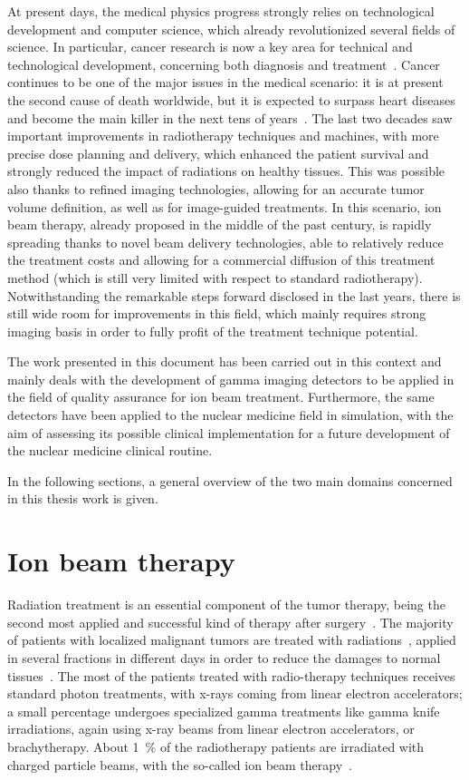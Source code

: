 At present days, the medical physics progress strongly relies on technological development and computer science, which already revolutionized several fields of science. In particular, cancer research is now a key area for technical and technological development, concerning both diagnosis and treatment~\parencite{Webb2009}. Cancer continues to be one of the major issues in the medical scenario: it is at present the second cause of death worldwide, but it is expected to surpass heart diseases and become the main killer in the next tens of years~\parencite{Jemal2010, Thun2010}. The last two decades saw important improvements in radiotherapy techniques and machines, with more precise dose planning and delivery, which enhanced the patient survival and strongly reduced the impact of radiations on healthy tissues. This was possible also thanks to refined imaging technologies, allowing for an accurate tumor volume definition, as well as for image-guided treatments. In this scenario, ion beam therapy, already proposed in the middle of the past century, is rapidly spreading thanks to novel beam delivery technologies, able to relatively reduce the treatment costs and allowing for a commercial diffusion of this treatment method (which is still very limited with respect to standard radiotherapy). Notwithstanding the remarkable steps forward disclosed in the last years, there is still wide room for improvements in this field, which mainly requires strong imaging basis in order to fully profit of the treatment technique potential.

The work presented in this document has been carried out in this context and mainly deals with the development of gamma imaging detectors to be applied in the field of quality assurance for ion beam treatment. Furthermore, the same detectors have been applied to the nuclear medicine field in simulation, with the aim of assessing its possible clinical implementation for a future development of the nuclear medicine clinical routine. 

In the following sections, a general overview of the two main domains concerned in this thesis work is given. 

\section{Ion beam therapy}\label{chap1::sec::ionBeamTher}
Radiation treatment is an essential component of the tumor therapy, being the second most applied and successful kind of therapy after surgery~\parencite{Schardt2010}. The majority of patients with localized malignant tumors are treated with radiations~\parencite{Durante2009, Baskar2012, Moding2013}, applied in several fractions in different days in order to reduce the damages to normal tissues~\parencite{Bentzen2006}. The most of the patients treated with radio-therapy techniques receives standard photon treatments, with x-rays coming from linear electron accelerators; a small percentage undergoes specialized gamma treatments like gamma knife irradiations, again using x-ray beams from linear electron accelerators, or brachytherapy. About 1~\% of the radiotherapy patients are irradiated with charged particle beams, with the so-called ion beam therapy~\parencite{Durante2016}.

